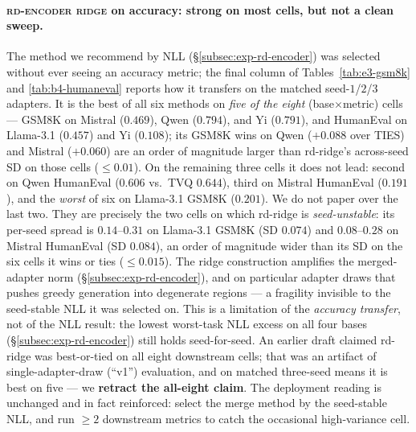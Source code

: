 \paragraph{\textsc{rd-encoder ridge} on accuracy: strong on most
cells, but not a clean sweep.} The method we recommend by NLL
(\S\ref{subsec:exp-rd-encoder}) was selected without ever seeing an
accuracy metric; the final column of Tables~\ref{tab:e3-gsm8k} and
\ref{tab:b4-humaneval} reports how it transfers on the matched
seed-$1$/$2$/$3$ adapters. It is the best of all six methods on
\emph{five of the eight} (base$\times$metric) cells --- GSM8K on
Mistral ($0.469$), Qwen ($0.794$), and Yi ($0.791$), and HumanEval on
Llama-3.1 ($0.457$) and Yi ($0.108$); its GSM8K wins on Qwen
($+0.088$ over TIES) and Mistral ($+0.060$) are an order of magnitude
larger than rd-ridge's across-seed SD on those cells ($\leq 0.01$). On
the remaining three cells it does not lead: second on Qwen HumanEval
($0.606$ vs.\ TVQ $0.644$), third on Mistral HumanEval ($0.191$), and
the \emph{worst} of six on Llama-3.1 GSM8K ($0.201$). We do not paper
over the last two. They are precisely the two cells on which rd-ridge
is \emph{seed-unstable}: its per-seed spread is $0.14$--$0.31$ on
Llama-3.1 GSM8K (SD $0.074$) and $0.08$--$0.28$ on Mistral HumanEval
(SD $0.084$), an order of magnitude wider than its SD on the six cells
it wins or ties ($\leq 0.015$). The ridge construction amplifies the
merged-adapter norm (\S\ref{subsec:exp-rd-encoder}), and on particular
adapter draws that pushes greedy generation into degenerate regions ---
a fragility invisible to the seed-stable NLL it was selected on. This
is a limitation of the \emph{accuracy transfer}, not of the NLL result:
the lowest worst-task NLL excess on all four bases
(\S\ref{subsec:exp-rd-encoder}) still holds seed-for-seed. An earlier
draft claimed rd-ridge was best-or-tied on all eight downstream cells;
that was an artifact of single-adapter-draw (``v1'') evaluation, and on
matched three-seed means it is best on five --- we \textbf{retract the
all-eight claim}. The deployment reading is unchanged and in fact
reinforced: select the merge method by the seed-stable NLL, and run
$\geq 2$ downstream metrics to catch the occasional high-variance cell.

